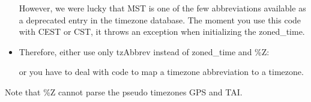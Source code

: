 \begin{itemize}
However, we were lucky that MST is one of the few abbreviations available as a deprecated entry in the timezone database. The moment you use this code with CEST or CST, it throws an exception when initializing the zoned\_time.

\item
Therefore, either use only tzAbbrev instead of zoned\_time and \%Z:


or you have to deal with code to map a timezone abbreviation to a timezone.
\end{itemize}

Note that \%Z cannot parse the pseudo timezones GPS and TAI.





